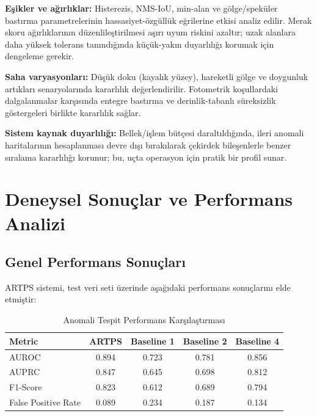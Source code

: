 \documentclass[12pt]{article}
\begin{document}
\textbf{Eşikler ve ağırlıklar:} Histerezis, NMS-IoU, min-alan ve gölge/speküler bastırma parametrelerinin hassasiyet-özgüllük eğrilerine etkisi analiz edilir. Merak skoru ağırlıklarının düzenlileştirilmesi aşırı uyum riskini azaltır; uzak alanlara daha yüksek tolerans tanındığında küçük-yakın duyarlılığı korumak için dengeleme gerekir.

\textbf{Saha varyasyonları:} Düşük doku (kayalık yüzey), hareketli gölge ve doygunluk artıkları senaryolarında kararlılık değerlendirilir. Fotometrik koşullardaki dalgalanmalar karşısında entegre bastırma ve derinlik-tabanlı süreksizlik göstergeleri birlikte kararlılık sağlar.

\textbf{Sistem kaynak duyarlılığı:} Bellek/işlem bütçesi daraltıldığında, ileri anomali haritalarının hesaplanması devre dışı bırakılarak çekirdek bileşenlerle benzer sıralama kararlılığı korunur; bu, uçta operasyon için pratik bir profil sunar.

\section{Deneysel Sonuçlar ve Performans Analizi}
\subsection{Genel Performans Sonuçları}
ARTPS sistemi, test veri seti üzerinde aşağıdaki performans sonuçlarını elde etmiştir:

\begin{table}[h]
\centering
\begin{tabular}{|l|c|c|c|c|}
\hline
\textbf{Metric} & \textbf{ARTPS} & \textbf{Baseline 1} & \textbf{Baseline 2} & \textbf{Baseline 4} \\
\hline
AUROC & 0.894 & 0.723 & 0.781 & 0.856 \\
AUPRC & 0.847 & 0.645 & 0.698 & 0.812 \\
F1-Score & 0.823 & 0.612 & 0.689 & 0.794 \\
False Positive Rate & 0.089 & 0.234 & 0.187 & 0.134 \\
\hline
\end{tabular}
\caption{Anomali Tespit Performans Karşılaştırması}
\end{table}
\end{document}
